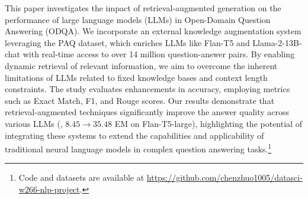This paper investigates the impact of retrieval-augmented generation on the performance of large language models (LLMs) in Open-Domain Question Answering (ODQA). We incorporate an external knowledge augmentation system leveraging the PAQ dataset, which enriches LLMs like Flan-T5 and Llama-2-13B-chat with real-time access to over 14 million question-answer pairs. By enabling dynamic retrieval of relevant information, we aim to overcome the inherent limitations of LLMs related to fixed knowledge bases and context length constraints. The study evaluates enhancements in accuracy, employing metrics such as Exact Match, F1, and Rouge scores. Our results demonstrate that retrieval-augmented techniques significantly improve the answer quality across various LLMs (\eg, $8.45 \rightarrow 35.48$ EM on Flan-T5-large), highlighting the potential of integrating these systems to extend the capabilities and applicability of traditional neural language models in complex question answering tasks.\footnote{Code and datasets are available at \url{https://github.com/chenzhuo1005/datasci-w266-nlp-project}.}
